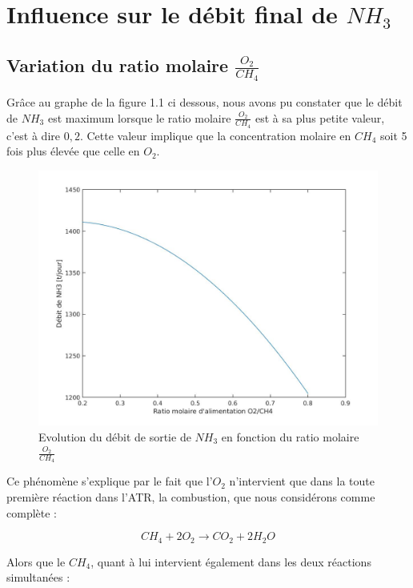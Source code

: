 \documentclass[12pt]{report}
\begin{document}
\section{Influence sur le débit final de $NH_3$}


\subsection{Variation du ratio molaire $\frac{O_2}{CH_4}$}

Grâce au graphe de la figure 1.1 ci dessous, nous avons pu constater que le débit de $NH_3$ est maximum lorsque le ratio molaire $\frac{O_2}{CH_4}$ est à sa plus petite valeur, c'est à dire $0,2$. Cette valeur implique que la concentration molaire en $CH_4$ soit 5 fois plus élevée que celle en $O_2$.

\begin{figure}[H]
\begin{center}
\includegraphics[scale=0.3]{debit_NH3_ratio_O2}
\caption{Evolution du débit de sortie de $NH_3$ en fonction du ratio molaire $\frac{O_2}{CH_4}$}
\end{center}
\end{figure}

Ce phénomène s'explique par le fait que l'$O_2$ n'intervient que dans la toute première réaction dans l'ATR, la combustion, que nous considérons comme complète :

\begin{equation}
 CH_4 + 2O_2 \rightarrow CO_2 + 2H_2O
\end{equation}

 
 Alors que le $CH_4$, quant à lui intervient également dans les deux réactions simultanées :
 
\end{document}
